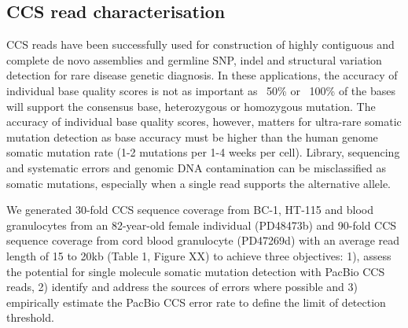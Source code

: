 \subsection{CCS read characterisation}

CCS reads have been successfully used for construction of highly contiguous and complete de novo assemblies and germline SNP, indel and structural variation detection for rare disease genetic diagnosis. In these applications, the accuracy of individual base quality scores is not as important as ~50\% or ~100\% of the bases will support the consensus base, heterozygous or homozygous mutation. The accuracy of individual base quality scores, however, matters for ultra-rare somatic mutation detection as base accuracy must be higher than the human genome somatic mutation rate (1-2 mutations per 1-4 weeks per cell). Library, sequencing and systematic errors and genomic DNA contamination can be misclassified as somatic mutations, especially when a single read supports the alternative allele. 

We generated 30-fold CCS sequence coverage from BC-1, HT-115 and blood granulocytes from an 82-year-old female individual (PD48473b) and 90-fold CCS sequence coverage from cord blood granulocyte (PD47269d) with an average read length of 15 to 20kb (Table 1, Figure XX) to achieve three objectives: 1), assess the potential for single molecule somatic mutation detection with PacBio CCS reads, 2) identify and address the sources of errors where possible and 3) empirically estimate the PacBio CCS error rate to define the limit of detection threshold. 

